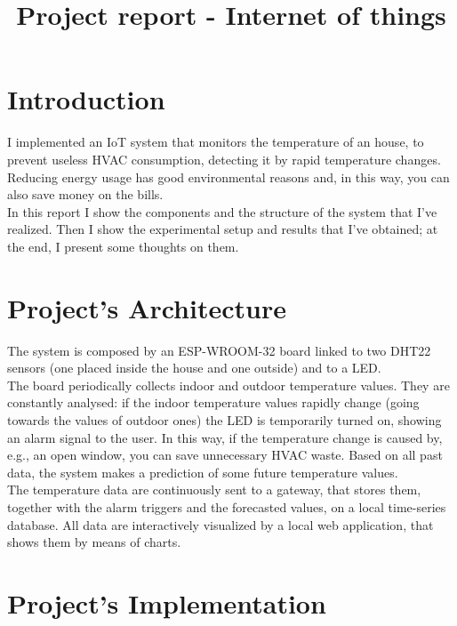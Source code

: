 \documentclass[conference]{IEEEtran}
\begin{document}
\title{Project report - Internet of things}

\author{
}

\maketitle


\section{Introduction}
I implemented an IoT system that monitors the temperature of an house, to prevent useless HVAC consumption, detecting it by rapid temperature changes. Reducing energy usage has good environmental reasons and, in this way, you can also save money on the bills.\\
In this report I show the components and the structure of the system that I've realized. Then I show the experimental setup and results that I've obtained; at the end, I present some thoughts on them.


\section{Project’s Architecture}
The system is composed by an ESP-WROOM-32 board linked to two DHT22 sensors (one placed inside the house and one outside) and to a LED.\\
The board periodically collects indoor and outdoor temperature values. They are constantly analysed: if the indoor temperature values rapidly change (going towards the values of outdoor ones) the LED is temporarily turned on, showing an alarm signal to the user. In this way, if the temperature change is caused by, e.g., an open window, you can save unnecessary HVAC waste. Based on all past data, the system makes a prediction of some future temperature values.\\
The temperature data are continuously sent to a gateway, that stores them, together with the alarm triggers and the forecasted values, on a local time-series database. All data are interactively visualized by a local web application, that shows them by means of charts.


\section{Project’s Implementation}
\end{document}
